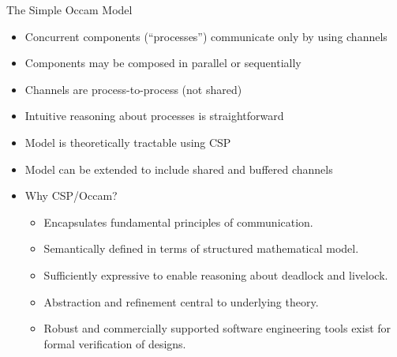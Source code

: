 \documentclass{concdistfoils}
\def\heading#1{\begin{cframed}[8.8in]{#1}\end{cframed}}
\begin{document}
\begin{slide}
\heading{The Simple Occam Model}
\vfill
\begin{itemize}
\item Concurrent components (``processes'') communicate only by using channels
\item Components may be composed in parallel or sequentially
\item Channels are process-to-process (not shared)
\vfill
\item Intuitive reasoning about processes is straightforward
\item Model is theoretically tractable using CSP
\item Model can be extended to include shared and buffered channels
\end{itemize}
\end{slide}

\begin{slide}
\begin{itemize}
\item Why CSP/Occam?
\begin{itemize}
\item Encapsulates fundamental principles of communication.
\item Semantically defined in terms of structured mathematical
model.
\item Sufficiently expressive to enable reasoning about deadlock
and livelock.
\item Abstraction and refinement central to underlying theory.
\item Robust and commercially supported software
      engineering tools exist for formal 
      verification of designs.
\end{itemize}
\end{itemize}
\end{slide}
\end{document}
